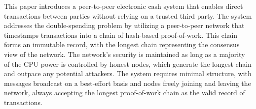 This paper introduces a peer-to-peer electronic cash system that enables direct transactions between parties without relying on a trusted third party. The system addresses the double-spending problem by utilizing a peer-to-peer network that timestamps transactions into a chain of hash-based proof-of-work. This chain forms an immutable record, with the longest chain representing the consensus view of the network. The network's security is maintained as long as a majority of the CPU power is controlled by honest nodes, which generate the longest chain and outpace any potential attackers. The system requires minimal structure, with messages broadcast on a best-effort basis and nodes freely joining and leaving the network, always accepting the longest proof-of-work chain as the valid record of transactions.
